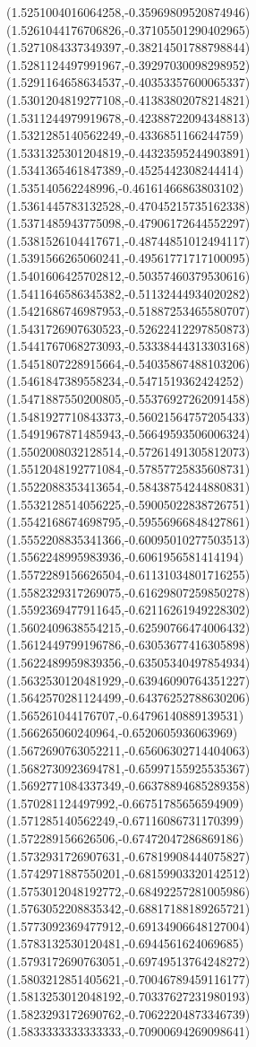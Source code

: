 \documentclass[12pt]{article}
\theoremstyle{plain}
\theoremstyle{definition}
\theoremstyle{remark}
\begin{document}
\begin{figure}
{  (1.5251004016064258,-0.35969809520874946)%
  (1.5261044176706826,-0.37105501290402965)%
  (1.5271084337349397,-0.38214501788798844)%
  (1.5281124497991967,-0.39297030098298952)%
  (1.5291164658634537,-0.40353357600065337)%
  (1.5301204819277108,-0.41383802078214821)%
  (1.5311244979919678,-0.42388722094348813)%
  (1.5321285140562249,-0.4336851166244759)%
  (1.5331325301204819,-0.44323595244903891)%
  (1.5341365461847389,-0.4525442308244414)%
  (1.535140562248996,-0.46161466863803102)%
  (1.5361445783132528,-0.47045215735162338)%
  (1.5371485943775098,-0.47906172644552297)%
  (1.5381526104417671,-0.48744851012494117)%
  (1.5391566265060241,-0.49561771717100095)%
  (1.5401606425702812,-0.50357460379530616)%
  (1.5411646586345382,-0.51132444934020282)%
  (1.5421686746987953,-0.51887253465580707)%
  (1.5431726907630523,-0.52622412297850873)%
  (1.5441767068273093,-0.53338444313303168)%
  (1.5451807228915664,-0.54035867488103206)%
  (1.5461847389558234,-0.5471519362424252)%
  (1.5471887550200805,-0.55376927262091458)%
  (1.5481927710843373,-0.56021564757205433)%
  (1.5491967871485943,-0.56649593506006324)%
  (1.5502008032128514,-0.57261491305812073)%
  (1.5512048192771084,-0.57857725835608731)%
  (1.5522088353413654,-0.58438754244880831)%
  (1.5532128514056225,-0.59005022838726751)%
  (1.5542168674698795,-0.59556966848427861)%
  (1.5552208835341366,-0.60095010277503513)%
  (1.5562248995983936,-0.6061956581414194)%
  (1.5572289156626504,-0.61131034801716255)%
  (1.5582329317269075,-0.61629807259850278)%
  (1.5592369477911645,-0.62116261949228302)%
  (1.5602409638554215,-0.62590766474006432)%
  (1.5612449799196786,-0.63053677416305898)%
  (1.5622489959839356,-0.63505340497854934)%
  (1.5632530120481929,-0.63946090764351227)%
  (1.5642570281124499,-0.64376252788630206)%
  (1.565261044176707,-0.64796140889139531)%
  (1.566265060240964,-0.6520605936063969)%
  (1.5672690763052211,-0.65606302714404063)%
  (1.5682730923694781,-0.65997155925535367)%
  (1.5692771084337349,-0.66378894685289358)%
  (1.570281124497992,-0.66751785656594909)%
  (1.571285140562249,-0.67116086731170399)%
  (1.572289156626506,-0.67472047286869186)%
  (1.5732931726907631,-0.67819908444075827)%
  (1.5742971887550201,-0.68159903320142512)%
  (1.5753012048192772,-0.68492257281005986)%
  (1.5763052208835342,-0.68817188189265721)%
  (1.5773092369477912,-0.69134906648127004)%
  (1.5783132530120481,-0.6944561624069685)%
  (1.5793172690763051,-0.69749513764248272)%
  (1.5803212851405621,-0.70046789459116177)%
  (1.5813253012048192,-0.70337627231980193)%
  (1.5823293172690762,-0.70622204873346739)%
  (1.5833333333333333,-0.70900694269098641)%
}
\end{figure}
\end{document}
